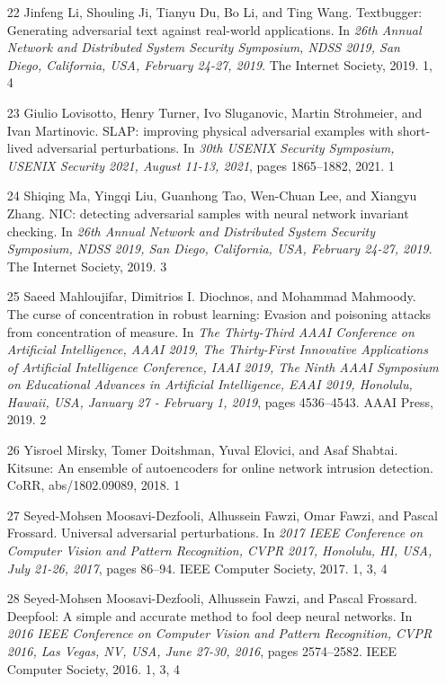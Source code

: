 \documentclass{article}
\begin{document}
\begin{itemize}
\item 
[22] Jinfeng Li, Shouling Ji, Tianyu Du, Bo Li, and Ting Wang. Textbugger: Generating adversarial text against real-world applications. In \textit{26th Annual Network and Distributed System Security Symposium, NDSS 2019, San Diego, California, USA, February 24-27, 2019}. The Internet Society, 2019. 1, 4

\item 
[23] Giulio Lovisotto, Henry Turner, Ivo Sluganovic, Martin Strohmeier, and Ivan Martinovic. SLAP: improving physical adversarial examples with short-lived adversarial perturbations. In \textit{30th USENIX Security Symposium, USENIX Security 2021, August 11-13, 2021}, pages 1865–1882, 2021. 1

\item 
[24] Shiqing Ma, Yingqi Liu, Guanhong Tao, Wen-Chuan Lee, and Xiangyu Zhang. NIC: detecting adversarial samples with neural network invariant checking. In \textit{26th Annual Network and Distributed System Security Symposium, NDSS 2019, San Diego, California, USA, February 24-27, 2019}. The Internet Society, 2019. 3

\item 
[25] Saeed Mahloujifar, Dimitrios I. Diochnos, and Mohammad Mahmoody. The curse of concentration in robust learning: Evasion and poisoning attacks from concentration of measure. In \textit{The Thirty-Third AAAI Conference on Artificial Intelligence, AAAI 2019, The Thirty-First Innovative Applications of Artificial Intelligence Conference, IAAI 2019, The Ninth AAAI Symposium on Educational Advances in Artificial Intelligence, EAAI 2019, Honolulu, Hawaii, USA, January 27 - February 1, 2019}, pages 4536–4543. AAAI Press, 2019. 2

\item 
[26] Yisroel Mirsky, Tomer Doitshman, Yuval Elovici, and Asaf Shabtai. Kitsune: An ensemble of autoencoders for online network intrusion detection. CoRR, abs/1802.09089, 2018. 1

\item 
[27] Seyed-Mohsen Moosavi-Dezfooli, Alhussein Fawzi, Omar Fawzi, and Pascal Frossard. Universal adversarial perturbations. In \textit{2017 IEEE Conference on Computer Vision and Pattern Recognition, CVPR 2017, Honolulu, HI, USA, July 21-26, 2017}, pages 86–94. IEEE Computer Society, 2017. 1, 3, 4

\item 
[28] Seyed-Mohsen Moosavi-Dezfooli, Alhussein Fawzi, and Pascal Frossard. Deepfool: A simple and accurate method to fool deep neural networks. In \textit{2016 IEEE Conference on Computer Vision and Pattern Recognition, CVPR 2016, Las Vegas, NV, USA, June 27-30, 2016}, pages 2574–2582. IEEE Computer Society, 2016. 1, 3, 4


\end{itemize}
\end{document}
